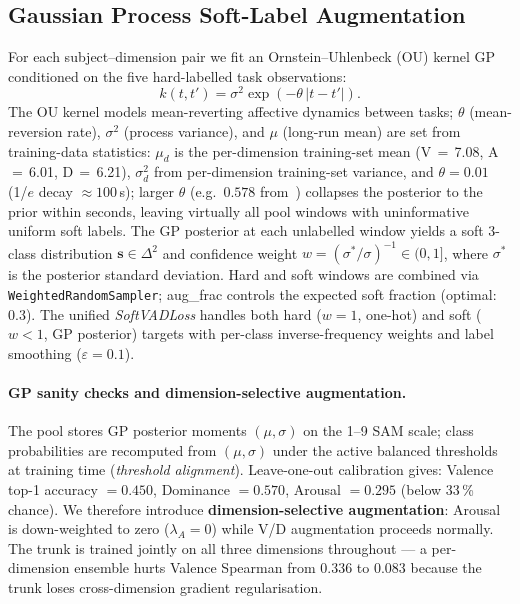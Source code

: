\documentclass[sigconf,review,anonymous]{acmart}
\begin{document}
\subsection{Gaussian Process Soft-Label Augmentation}
\label{sec:gp}

For each subject--dimension pair we fit an Ornstein--Uhlenbeck (OU) kernel
GP~\cite{rasmussen2006gaussian} conditioned on the five hard-labelled task
observations:
\begin{equation}
  k(t, t') = \sigma^2 \exp\!\left(-\theta\,|t - t'|\right).
\end{equation}
The OU kernel models mean-reverting affective dynamics between tasks;
$\theta$ (mean-reversion rate), $\sigma^2$ (process variance), and $\mu$
(long-run mean) are set from training-data statistics:
$\mu_d$ is the per-dimension training-set mean
(V\,$=$\,7.08, A\,$=$\,6.01, D\,$=$\,6.21),
$\sigma^2_d$ from per-dimension training-set variance,
and $\theta = 0.01$ (1/$e$ decay $\approx 100$\,s); larger $\theta$
(e.g.\ $0.578$ from~\citeauthor{meng2026moderating}) collapses the posterior
to the prior within seconds, leaving virtually all pool windows with
uninformative uniform soft labels.
The GP posterior at each unlabelled window yields a soft 3-class
distribution $\mathbf{s} \in \Delta^2$ and confidence weight
$w = (\sigma^* / \sigma)^{-1} \in (0,1]$, where $\sigma^*$ is the
posterior standard deviation.
Hard and soft windows are combined via \texttt{WeightedRandomSampler};
aug\_frac controls the expected soft fraction (optimal: 0.3).
The unified \emph{SoftVADLoss} handles both hard ($w=1$, one-hot) and
soft ($w < 1$, GP posterior) targets with per-class inverse-frequency
weights and label smoothing ($\varepsilon = 0.1$).

\paragraph{GP sanity checks and dimension-selective augmentation.}
The pool stores GP posterior moments $(\mu,\sigma)$ on the 1--9 SAM scale;
class probabilities are recomputed from $(\mu,\sigma)$ under the active
balanced thresholds at training time (\emph{threshold alignment}).
Leave-one-out calibration gives: Valence top-1 accuracy $=0.450$, Dominance
$=0.570$, Arousal $=0.295$ (below 33\,\% chance).
We therefore introduce \textbf{dimension-selective augmentation}: Arousal
is down-weighted to zero ($\lambda_A{=}0$) while V/D augmentation proceeds
normally.
The trunk is trained jointly on all three dimensions throughout --- a
per-dimension ensemble hurts Valence Spearman from $0.336$ to $0.083$
because the trunk loses cross-dimension gradient regularisation.
\end{document}
